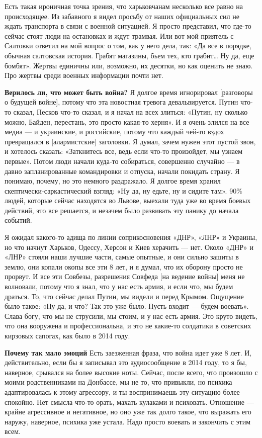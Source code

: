 Есть такая ироничная точка зрения, что харьковчанам несколько все равно на происходящее. Из забавного я видел просьбу от наших официальных сил не ждать транспорта в связи с военной ситуацией. Я просто представил, что где-то сейчас стоят люди на остановках и ждут трамвая. Или вот мой приятель с Салтовки ответил на мой вопрос о том, как у него дела, так: «Да все в порядке, обычная салтовская история. Грабят магазины, бьем тех, кто грабит… Ну да, еще бомбят». Жертвы единичны или, возможно, их десятки, но как оценить не знаю. Про жертвы среди военных информации почти нет.

\textbf{Верилось ли, что может быть война?}
Я долгое время игнорировал [разговоры о будущей войне], потому что эта новостная тревога девальвируется. Путин что-то сказал, Песков что-то сказал, и я начал на всех злиться: «Путин, ну сколько можно, Байден, перестань, это просто какая-то херня». И я очень злился на все медиа --- и украинские, и российские, потому что каждый чей-то вздох превращался в [алармистские] заголовки. Я думал, зачем нужен этот пустой звон, и хотелось сказать: «Заткнитесь все, ведь если что-то произойдет, мы узнаем первые». Потом люди начали куда-то собираться, совершенно случайно --- в давно запланированные командировки и отпуска, начали покидать страну. Я понимаю, почему, но это немного раздражало. Я долгое время хранил скептически-саркастический взгляд: «Ну да, ну едьте, ну и сидите там». 90\% людей, которые сейчас находятся во Львове, выехали туда уже во время боевых действий, это все решается, и незачем было развивать эту панику до начала событий.

Я ожидал какого-то адища по линии соприкосновения «ДНР», «ЛНР» и Украины, но что начнут Харьков, Одессу, Херсон и Киев херачить --- нет. Около «ДНР» и «ЛНР» стояли наши лучшие части, самые опытные, и они сильно зашиты в землю, они копали окопы все эти 8 лет, и я думал, что их оборону просто не прорвут. И все эти Совбезы, разрешения Совфеда [на ведение войны] меня не волновали, потому что я знал, что у нас есть армия, и если что, мы будем драться. То, что сейчас делал Путин, мы видели и перед Крымом. Ощущение было такое: «Ну да, и что? Так это уже было. Пусть входит --- будем воевать». Слава богу, что мы не струсили, мы стоим, и у нас есть армия. Это круто видеть, что она вооружена и профессиональна, и это не какие-то солдатики в советских кирзовых сапогах, как было в 2014 году.


\textbf{Почему так мало эмоций} Есть заезженная фраза, что война идет уже 8 лет. И, действительно, если бы я записывал это аудиосообщение в 2014 году, то я бы, наверное, срывался на более высокие ноты. Сейчас, после всего, что произошло с моими родственниками на Донбассе, мы не то, что привыкли, но психика адаптировалась к этому агрессору, и ты воспринимаешь эту ситуацию более спокойно. Нет смысла что-то орать, махать кулаками и психовать. Отношение --- крайне агрессивное и негативное, но оно уже так долго такое, что выражать его наружу, наверное, психика уже устала. Надо просто воевать и закончить с этим всем.


